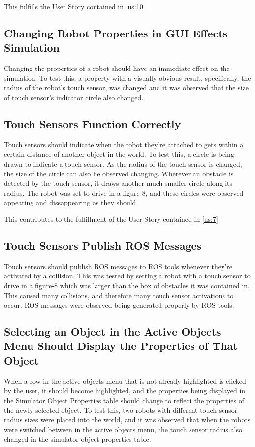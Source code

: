 This fulfills the User Story contained in \ref{us:10}

\subsection{Changing Robot Properties in GUI Effects Simulation}
Changing the properties of a robot should have an immediate effect on the simulation. To test this, a property with a visually obvious result, specifically, the radius of the robot's touch sensor, was changed and it was observed that the size of touch sensor's indicator circle also changed.

\subsection{Touch Sensors Function Correctly}
Touch sensors should indicate when the robot they're attached to gets within a certain distance of another object in the world. To test this, a circle is being drawn to indicate a touch sensor. As the radius of the touch sensor is changed, the size of the circle can also be observed changing. Wherever an obstacle is detected by the touch sensor, it draws another much smaller circle along its radius. The robot was set to drive in a figure-8, and these circles were observed appearing and dissappearing as they should.

This contributes to the fulfillment of the User Story contained in \ref{us:7}

\subsection{Touch Sensors Publish ROS Messages}
Touch sensors should publish ROS messages to ROS tools whenever they're activated by a collision. This was tested by setting a robot with a touch sensor to drive in a figure-8 which was larger than the box of obstacles it was contained in. This caused many collisions, and therefore many touch sensor activations to occur. ROS messages were observed being generated properly by ROS tools.

\subsection{Selecting an Object in the Active Objects Menu Should Display the Properties of That Object}
When a row in the active objects menu that is not already highlighted is clicked by the user, it should become highlighted, and the properties being displayed in the Simulator Object Properties table should change to reflect the properties of the newly selected object. To test this, two robots with different touch sensor radius sizes were placed into the world, and it was observed that when the robots were switched between in the active objects menu, the touch sensor radius also changed in the simulator object properties table.

